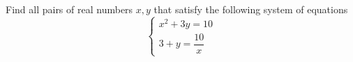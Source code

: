 Find all pairs of real numbers $x, y$ that satisfy the following system of equations \[
\begin{cases} x^2 + 3y = 10 \\ 3 + y = \dfrac{10}{ x} \end{cases}
\]
